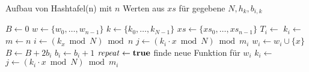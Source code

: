                 \begin{algorithm}
                    \capstart
                    \caption{Aufbau von Hashtafel(n) mit $n$ Werten aus $xs$ für gegebene $N, h_k, b_{i,k}$}
                    \label{alg:perfect-hashing-init}
                    \begin{algorithmic}
                        \State $B \gets 0$
                        \State $w \gets \{w_0, \dots, w_{n-1}\}$
                        \State $k \gets \{k_0, \dots, k_{N-1}\}$
                        \State $xs \gets \{xs_0, \dots, xs_{n-1}\}$
                                \State $T_i \gets $ 
                                \State $k_i \gets $ 
                            \EndFor
                            \State $m \gets n$
                                \State {}
                            \EndFor
                        \EndFunction
                        \Statex
                            \State $i \gets (k_x \bmod N) \bmod n$
                            \State $j \gets (k_i\cdot x \bmod N) \bmod m_i$ %
                            \State $w_i \gets w_i \cup \{x\}$
                            \State $B \gets B + 2 b_i$
                            \State $b_i \gets b_i + 1$
                                 \State {}
                            \Else
                                    \State {}
                                \Else {}
                                        \State $\text{\emph{repeat}} \gets \text{\textbf{true}}$
                                            \State {}
                                            \State finde neue Funktion für $w_i$ %
                                            \State $k_i \gets $ 
                                            \State {}
                                                \State $j \gets (k_i \cdot x \bmod N) \bmod m_i$

\end{algorithmic}
\end{algorithm}
